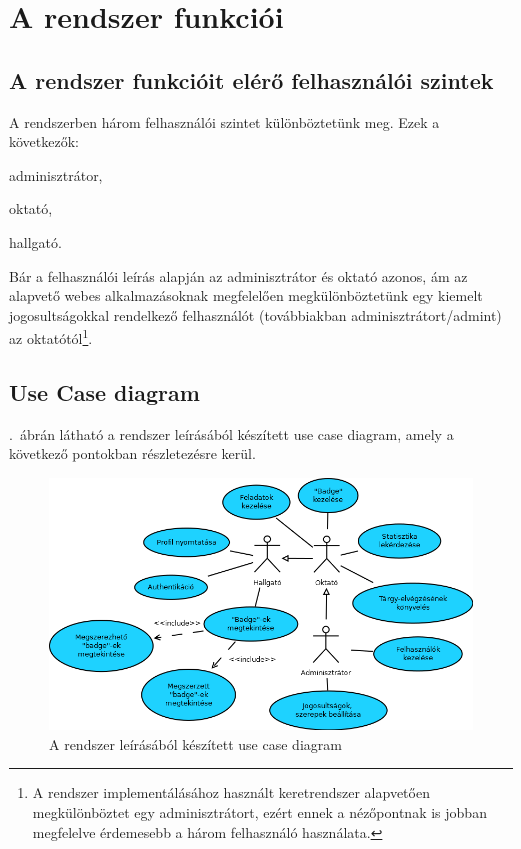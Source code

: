 \documentclass[a4paper,10pt,titlepage]{article}
\newenvironment{sajat_itemize}
{
	\begin{itemize}
	\setlength{\itemsep}{0pt}
}
{
	\end{itemize}
}
\begin{document}
\section{A rendszer funkciói}

\subsection{A rendszer funkcióit elérő felhasználói szintek}

A rendszerben három felhasználói szintet különböztetünk meg. Ezek a következők:

\begin{sajat_itemize}
\item adminisztrátor,
\item oktató,
\item hallgató.
\end{sajat_itemize}

Bár a felhasználói leírás alapján az adminisztrátor és oktató azonos, ám az alapvető webes alkalmazásoknak megfelelően megkülönböztetünk egy kiemelt jogosultságokkal rendelkező felhasználót (továbbiakban adminisztrátort/admint) az oktatótól\footnote{A rendszer implementálásához használt keretrendszer alapvetően megkülönböztet egy adminisztrátort, ezért ennek a nézőpontnak is jobban megfelelve érdemesebb a három felhasználó használata.}.

\subsection{Use Case diagram}

.~ábrán látható a rendszer leírásából készített use case diagram, amely a következő pontokban részletezésre kerül.

\begin{figure}[ht!]
\centering
\includegraphics[width=1.00\textwidth]{figures/use_case.png}
\caption{A rendszer leírásából készített use case diagram \label{fig:use_case}}
\end{figure}
\end{document}
